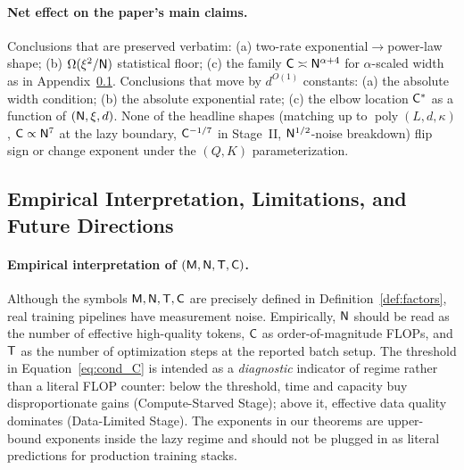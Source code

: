 \documentclass[11pt]{article}
\theoremstyle{plain}
\DeclareMathOperator{\poly}{poly}
\begin{document}
\paragraph{Net effect on the paper's main claims.}
Conclusions that are preserved verbatim: (a) two-rate exponential$\to$power-law shape; (b) $\Omega(\xi^2/{\sf N})$ statistical floor; (c) the family ${\sf C}\asymp {\sf N}^{\alpha+4}$ for $\alpha$-scaled width as in Appendix~\ref{app_sub:practitioner}. Conclusions that move by $d^{O(1)}$ constants: (a) the absolute width condition; (b) the absolute exponential rate; (c) the elbow location ${\sf C}^*$ as a function of $({\sf N},\xi,d)$. None of the headline shapes (matching up to $\poly(L,d,\kappa)$, ${\sf C}\propto {\sf N}^7$ at the lazy boundary, ${\sf C}^{-1/7}$ in Stage~II, ${\sf N}^{1/2}$-noise breakdown) flip sign or change exponent under the $(Q,K)$ parameterization.

\subsection{Empirical Interpretation, Limitations, and Future Directions}\label{app_sub:practitioner}

\paragraph{Empirical interpretation of $({\sf M}, {\sf N}, {\sf T}, {\sf C})$.} Although the symbols ${\sf M}, {\sf N}, {\sf T}, {\sf C}$ are precisely defined in Definition~\ref{def:factors}, real training pipelines have measurement noise. Empirically, ${\sf N}$ should be read as the number of effective high-quality tokens, ${\sf C}$ as order-of-magnitude FLOPs, and ${\sf T}$ as the number of optimization steps at the reported batch setup. The threshold in Equation~\eqref{eq:cond_C} is intended as a {\it diagnostic} indicator of regime rather than a literal FLOP counter: below the threshold, time and capacity buy disproportionate gains (Compute-Starved Stage); above it, effective data quality dominates (Data-Limited Stage). The exponents in our theorems are upper-bound exponents inside the lazy regime and should not be plugged in as literal predictions for production training stacks.
\end{document}
